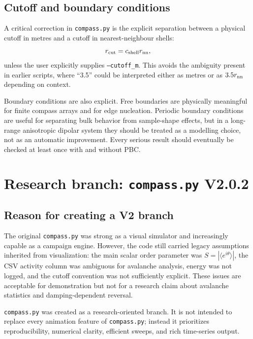 \documentclass[11pt,a4paper]{article}
\newcommand{\code}[1]{\texttt{#1}}
\begin{document}
\subsection{Cutoff and boundary conditions}

A critical correction in \code{compass.py} is the explicit separation between a physical cutoff in metres and a cutoff in nearest-neighbour shells:
\begin{equation}
r_{\rm cut} = c_{\rm shell} r_{\rm nn},
\end{equation}
unless the user explicitly supplies \code{--cutoff\_m}. This avoids the ambiguity present in earlier scripts, where ``3.5'' could be interpreted either as metres or as $3.5r_{\rm nn}$ depending on context.

Boundary conditions are also explicit. Free boundaries are physically meaningful for finite compass arrays and for edge nucleation. Periodic boundary conditions are useful for separating bulk behavior from sample-shape effects, but in a long-range anisotropic dipolar system they should be treated as a modelling choice, not as an automatic improvement. Every serious result should eventually be checked at least once with and without PBC.

\section{Research branch: \code{compass.py} V2.0.2}
\label{sec:compassv2}

\subsection{Reason for creating a V2 branch}

The original \code{compass.py} was strong as a visual simulator and increasingly capable as a campaign engine. However, the code still carried legacy assumptions inherited from visualization: the main scalar order parameter was $S=|\langle e^{i\theta}\rangle|$, the CSV activity column was ambiguous for avalanche analysis, energy was not logged, and the cutoff convention was not sufficiently explicit. These issues are acceptable for demonstration but not for a research claim about avalanche statistics and damping-dependent reversal.

\code{compass.py} was created as a research-oriented branch. It is not intended to replace every animation feature of \code{compass.py}; instead it prioritizes reproducibility, numerical clarity, efficient sweeps, and rich time-series output.
\end{document}
